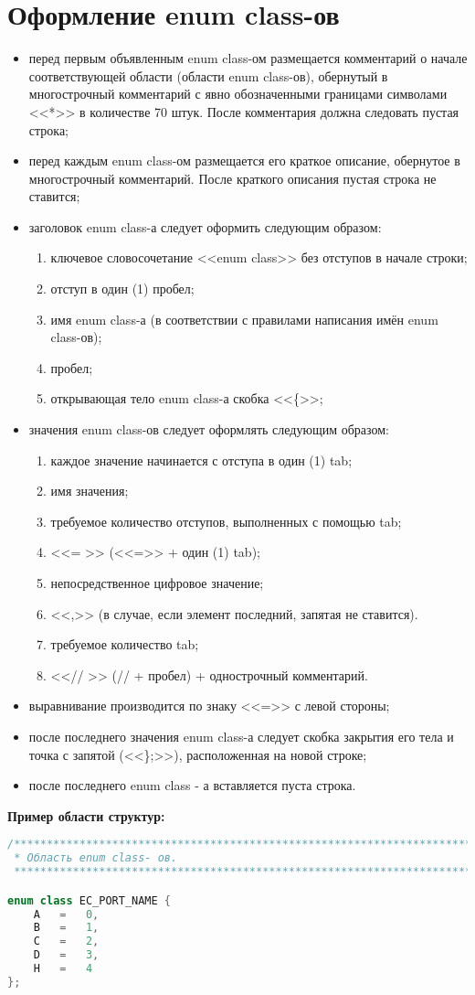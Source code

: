 \section{Оформление enum class-ов}
\begin{itemize}
	\item перед первым объявленным enum class-ом размещается комментарий о начале соответствующей области (области enum class-ов), обернутый в многострочный комментарий с явно обозначенными границами символами <<*>> в количестве 70 штук. После комментария должна следовать  пустая строка;
	\item перед каждым enum class-ом размещается его краткое описание, обернутое в многострочный комментарий. После краткого описания пустая строка не ставится;
	\item заголовок enum class-а следует оформить следующим образом:
	\begin{enumerate}
		\item ключевое словосочетание <<enum class>> без отступов в начале строки;
		\item отступ в один (1) пробел;
		\item имя enum class-а (в соответствии с правилами написания имён enum class-ов);
		\item пробел;
		\item открывающая тело enum class-а скобка <<\{>>;
	\end{enumerate}
	\item значения enum class-ов следует оформлять следующим образом:
	\begin{enumerate}
		\item каждое значение начинается с отступа в один (1) tab;
		\item имя значения;
		\item требуемое количество отступов, выполненных с помощью tab;
		\item <<=	>> (<<=>> + один (1) tab);
		\item непосредственное цифровое значение;
		\item <<,>> (в случае, если элемент последний, запятая не ставится).
		\item требуемое количество tab;
		\item <<// >> (// + пробел) + однострочный комментарий.
	\end{enumerate}
	\item выравнивание производится по знаку <<=>> с левой стороны;
	\item после последнего значения enum class-а следует скобка закрытия его тела и точка с запятой (<<\};>>), расположенная на новой строке;
	\item после последнего enum class - а вставляется пуста строка.
\end{itemize}\textbf{Пример области структур:}\begin{lstlisting}[language=C++, frame=tlBR, basicstyle=\fontsize{10}{10}\ttfamily]
/**********************************************************************
 * Область enum class- ов.
 **********************************************************************/

enum class EC_PORT_NAME {
	A	=	0,
	B	=	1,
	C	=	2,
	D	=	3,
	H	=	4
};\end{lstlisting}